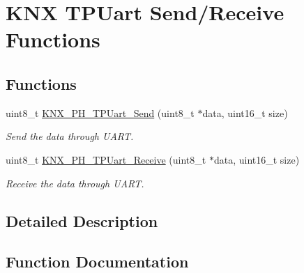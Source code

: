 \hypertarget{group___k_n_x___p_h___t_p_uart___exported___functions___group2}{}\section{K\+NX T\+P\+Uart Send/\+Receive Functions}
\label{group___k_n_x___p_h___t_p_uart___exported___functions___group2}
\subsection*{Functions}
\begin{DoxyCompactItemize}
\item 
uint8\+\_\+t \hyperlink{group___k_n_x___p_h___t_p_uart___exported___functions___group2_ga03bb9beec6389f866c95a482303c23e3}{K\+N\+X\+\_\+\+P\+H\+\_\+\+T\+P\+Uart\+\_\+\+Send} (uint8\+\_\+t $\ast$data, uint16\+\_\+t size)
\begin{DoxyCompactList}\small\item\em Send the data through U\+A\+RT. \end{DoxyCompactList}\item 
uint8\+\_\+t \hyperlink{group___k_n_x___p_h___t_p_uart___exported___functions___group2_gaa5e10cfbb87008f0375132601fbbfa87}{K\+N\+X\+\_\+\+P\+H\+\_\+\+T\+P\+Uart\+\_\+\+Receive} (uint8\+\_\+t $\ast$data, uint16\+\_\+t size)
\begin{DoxyCompactList}\small\item\em Receive the data through U\+A\+RT. \end{DoxyCompactList}\end{DoxyCompactItemize}


\subsection{Detailed Description}


\subsection{Function Documentation}

